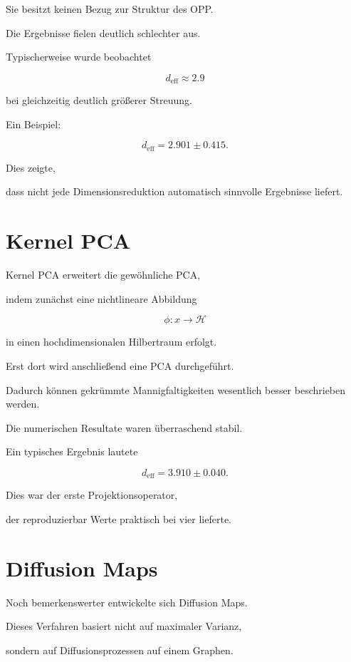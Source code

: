 Sie besitzt keinen Bezug zur Struktur des OPP.

Die Ergebnisse fielen deutlich schlechter aus.

Typischerweise wurde beobachtet

\[
d_{\mathrm{eff}}
\approx
2.9
\]

bei gleichzeitig deutlich größerer Streuung.

Ein Beispiel:

\[
d_{\mathrm{eff}}
=
2.901
\pm
0.415.
\]

Dies zeigte,

dass nicht jede Dimensionsreduktion automatisch sinnvolle Ergebnisse liefert.


\section*{Kernel PCA}

Kernel PCA erweitert die gewöhnliche PCA,

indem zunächst eine nichtlineare Abbildung

\[
\phi
:
x
\rightarrow
\mathcal{H}
\]

in einen hochdimensionalen Hilbertraum erfolgt.

Erst dort wird anschließend eine PCA durchgeführt.

Dadurch können gekrümmte Mannigfaltigkeiten wesentlich besser beschrieben werden.

Die numerischen Resultate waren überraschend stabil.

Ein typisches Ergebnis lautete

\[
d_{\mathrm{eff}}
=
3.910
\pm
0.040.
\]

Dies war der erste Projektionsoperator,

der reproduzierbar Werte praktisch bei vier lieferte.


\section*{Diffusion Maps}

Noch bemerkenswerter entwickelte sich Diffusion Maps.

Dieses Verfahren basiert nicht auf maximaler Varianz,

sondern auf Diffusionsprozessen auf einem Graphen.

